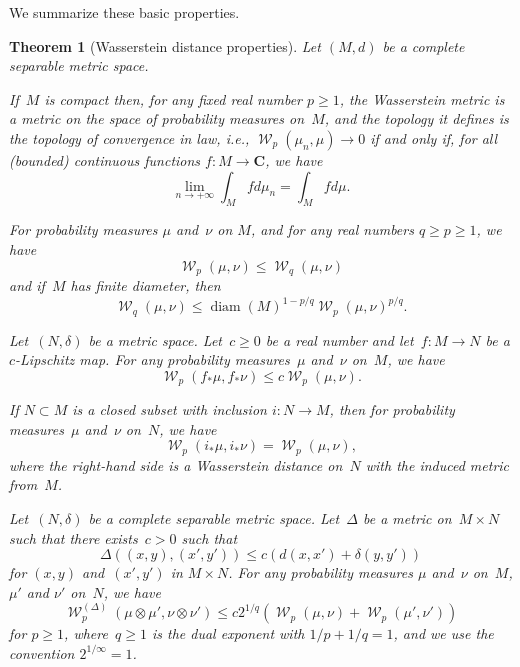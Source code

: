 \documentclass[12pt]{amsart}
\renewcommand{\mathcal}{\mathscr}
\renewcommand{\leq}{\leqslant}
\renewcommand{\geq}{\geqslant}
\newcommand{\Cc}{\mathbf{C}}
\DeclareMathOperator{\diam}{diam}
\DeclareMathOperator{\wass}{\mathcal{W}}
\theoremstyle{plain}
\newtheorem{theorem}{Theorem}[section]
\theoremstyle{remark}
\theoremstyle{definition}
\renewcommand{\geq}{\geqslant}
\renewcommand{\leq}{\leqslant}
\begin{document}
We summarize these basic properties.

\begin{theorem}[Wasserstein distance properties]\label{th-wass}
  Let $(M,d)$ be a complete separable metric space.

  \begin{enumth}
  \item If~$M$ is compact then, for any fixed real number $p\geq 1$, the
    Wasserstein metric is a metric on the space of probability measures
    on~$M$, and the topology it defines is the topology of convergence
    in law, i.e., $\wass_p(\mu_n,\mu)\to 0$ if and only if, for all
    (bounded) continuous functions $f\colon M\to\Cc$, we have
    \[
      \lim_{n\to+\infty}\int_M fd\mu_n=\int_Mfd\mu.
    \]
    
  \item For probability measures $\mu$ and~$\nu$ on $M$, and for any
    real numbers $q\geq p\geq 1$, we have
    \[
      \wass_p(\mu,\nu)\leq \wass_{q}(\mu,\nu)
    \]
    and if~$M$ has finite diameter, then
    \begin{equation}\label{eq-pq-bound}
      \wass_q(\mu,\nu)\leq \diam(M)^{1-p/q}\wass_p(\mu,\nu)^{p/q}.
    \end{equation}
        
  \item Let~$(N,\delta)$ be a metric space. Let~$c\geq 0$ be a real
    number and let~$f\colon M\to N$ be a $c$-Lipschitz map. For any
    probability measures~$\mu$ and~$\nu$ on~$M$, we have
    \[
      \wass_p(f_*\mu,f_*\nu)\leq c\wass_p(\mu,\nu).
    \]

  \item If $N\subset M$ is a closed subset with inclusion
    $i\colon N\to M$, then for probability measures~$\mu$ and~$\nu$
    on~$N$, we have
    \[
      \wass_p(i_*\mu,i_*\nu)=\wass_p(\mu,\nu),
    \]
    where the right-hand side is a Wasserstein distance on~$N$ with
    the induced metric from~$M$.

  \item Let~$(N,\delta)$ be a complete separable metric
    space. Let~$\Delta$ be a metric on~$M\times N$ such that there
    exists~$c>0$ such that
    \[
      \Delta((x,y),(x',y'))\leq c(d(x,x')+\delta(y,y'))
    \]
    for $(x,y)$ and~$(x',y')$ in $M\times N$. For any probability
    measures $\mu$ and~$\nu$ on~$M$, $\mu'$ and $\nu'$ on~$N$, we have
    \[
      \wass_p^{(\Delta)}(\mu\otimes\mu',\nu\otimes\nu')
      \leq c2^{1/q}(\wass_p(\mu,\nu)+\wass_p(\mu',\nu'))
    \]
    for $p\geq 1$, where~$q\geq 1$ is the dual exponent with
    $1/p+1/q=1$, and we use the convention $2^{1/\infty}=1$.
    

\end{enumth}
\end{theorem}
\end{document}
